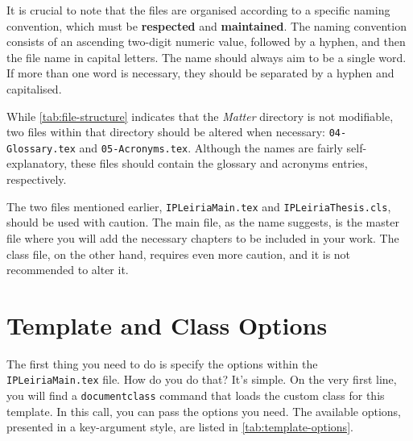 It is crucial to note that the files are organised according to a specific naming convention, which must be \textbf{respected} and \textbf{maintained}. The naming convention consists of an ascending two-digit numeric value, followed by a hyphen, and then the file name in capital letters. The name should always aim to be a single word. If more than one word is necessary, they should be separated by a hyphen and capitalised.

\begin{block}[note]
While \autoref{tab:file-structure} indicates that the \textit{Matter} directory is not modifiable, two files within that directory should be altered when necessary: \texttt{04-Glossary.tex} and \texttt{05-Acronyms.tex}. Although the names are fairly self-explanatory, these files should contain the glossary and acronyms entries, respectively.
\end{block}

The two files mentioned earlier, \texttt{IPLeiriaMain.tex} and \texttt{IPLeiriaThesis.cls}, should be used with caution. The main file, as the name suggests, is the master file where you will add the necessary chapters to be included in your work. The class file, on the other hand, requires even more caution, and it is not recommended to alter it.

\section{Template and Class Options}
\label{sec:class-options}
The first thing you need to do is specify the options within the \texttt{IPLeiriaMain.tex} file. How do you do that? It's simple. On the very first line, you will find a \texttt{documentclass} command that loads the custom class for this template. In this call, you can pass the options you need. The available options, presented in a key-argument style, are listed in \autoref{tab:template-options}.


